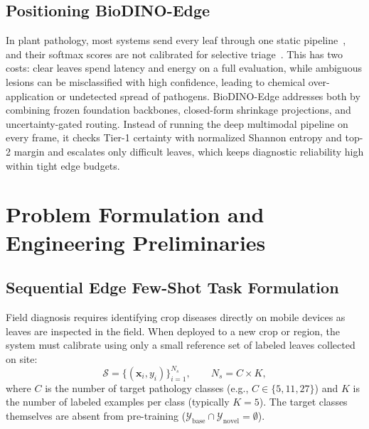 \documentclass[preprint,12pt]{elsarticle}
\begin{document}
\subsection{Positioning BioDINO-Edge}
In plant pathology, most systems send every leaf through one static pipeline~\cite{zhao2026lightweight}, and their softmax scores are not calibrated for selective triage~\cite{guo2017calibration}. This has two costs: clear leaves spend latency and energy on a full evaluation, while ambiguous lesions can be misclassified with high confidence, leading to chemical over-application or undetected spread of pathogens. BioDINO-Edge addresses both by combining frozen foundation backbones, closed-form shrinkage projections, and uncertainty-gated routing. Instead of running the deep multimodal pipeline on every frame, it checks Tier-1 certainty with normalized Shannon entropy and top-2 margin and escalates only difficult leaves, which keeps diagnostic reliability high within tight edge budgets.
\section{Problem Formulation and Engineering Preliminaries}
\label{sec:problem_formulation}

\subsection{Sequential Edge Few-Shot Task Formulation}
\label{sec:task_formulation}
Field diagnosis requires identifying crop diseases directly on mobile devices as leaves are inspected in the field. When deployed to a new crop or region, the system must calibrate using only a small reference set of labeled leaves collected on site:
\begin{equation}
    \mathcal{S} = \{(\mathbf{x}_i, y_i)\}_{i=1}^{N_s}, \qquad N_s = C \times K,
\end{equation}
where $C$ is the number of target pathology classes (e.g., $C \in \{5, 11, 27\}$) and $K$ is the number of labeled examples per class (typically $K = 5$). The target classes themselves are absent from pre-training ($\mathcal{Y}_{\text{base}} \cap \mathcal{Y}_{\text{novel}} = \emptyset$).
\end{document}
